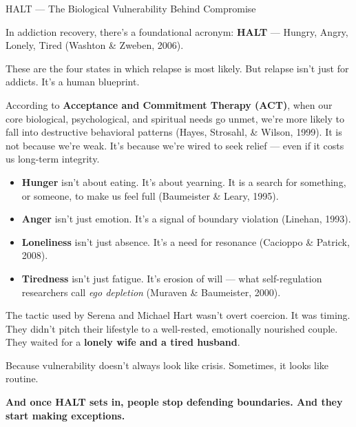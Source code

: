 \begin{PsychologicalSidebar}{HALT — The Biological Vulnerability Behind Compromise}

  In addiction recovery, there’s a foundational acronym: \textbf{HALT} — Hungry, Angry, Lonely, Tired 
  (Washton \& Zweben, 2006).

  \medskip
  
  These are the four states in which relapse is most likely.  
  But relapse isn’t just for addicts. It’s a human blueprint.

  \medskip

  According to \textbf{Acceptance and Commitment Therapy (ACT)}, when our core biological, psychological, 
  and spiritual needs go unmet, we’re more likely to fall into destructive behavioral patterns 
  (Hayes, Strosahl, \& Wilson, 1999).  
  It is not because we’re weak. It’s because we’re wired to seek relief — even if it costs us long-term integrity.

  \medskip
 
  \begin{itemize}
    \item \textbf{Hunger} isn’t about eating. It’s about yearning.  
    It is a search for something, or someone, to make us feel full (Baumeister \& Leary, 1995).

    \item \textbf{Anger} isn’t just emotion. It’s a signal of boundary violation (Linehan, 1993).

    \item \textbf{Loneliness} isn’t just absence. It’s a need for resonance (Cacioppo \& Patrick, 2008).

    \item \textbf{Tiredness} isn’t just fatigue. It’s erosion of will  
    — what self-regulation researchers call \textit{ego depletion} (Muraven \& Baumeister, 2000).
  \end{itemize}
  
  \medskip
  
  The tactic used by Serena and Michael Hart wasn’t overt coercion. It was timing.  
  They didn’t pitch their lifestyle to a well-rested, emotionally nourished couple.  
  They waited for a \textbf{lonely wife and a tired husband}.

  \medskip
  
  Because vulnerability doesn’t always look like crisis.  
  Sometimes, it looks like routine.

  \medskip
  
  \textbf{And once HALT sets in, people stop defending boundaries. And they start making exceptions.}

\end{PsychologicalSidebar}



